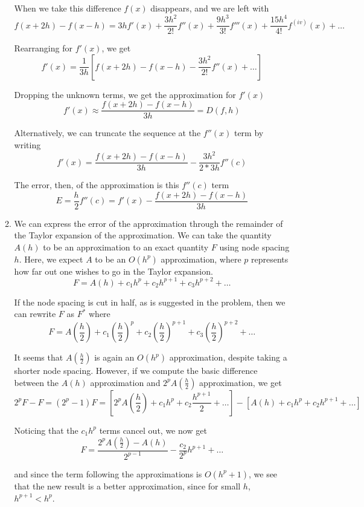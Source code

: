 \documentclass[11pt]{article}
\begin{document}
\begin{enumerate}
\begin{enumerate}
		When we take this difference $f(x)$ disappears, and we are left with
		\[
		f(x+2h) - f(x-h) = 3hf'(x) + \frac{3h^2}{2!}f''(x) + \frac{9h^3}{3!}f'''(x) + \frac{15h^4}{4!}f^{(iv)}(x) + \ldots
		\]

		Rearranging for $f'(x)$, we get
		\[
		f'(x) = \frac{1}{3h}[f(x+2h)-f(x-h)-\frac{3h^2}{2!}f''(x) + \ldots]
		\]

		Dropping the unknown terms, we get the approximation for $f'(x)$
		\[
		f'(x) \approx \frac{f(x+2h)-f(x-h)}{3h} = D(f,h)
		\]

		Alternatively, we can truncate the sequence at the $f''(x)$ term by writing
		\[
		f'(x) = \frac{f(x+2h) - f(x-h)}{3h} - \frac{3h^2}{2*3h}f''(c)
		\]

		The error, then, of the approximation is this $f''(c)$ term
		\[
		E = \frac{h}{2}f''(c) = f'(x) - \frac{f(x+2h)-f(x-h)}{3h}
		\]

		\item We can express the error of the approximation through the remainder of the Taylor expansion of the approximation. We can take the quantity $A(h)$ to be an approximation to an exact quantity $F$ using node spacing $h$. Here, we expect $A$ to be an $O(h^p)$ approximation, where $p$ represents how far out one wishes to go in the Taylor expansion.
		\[
		F = A(h) + c_1h^p + c_2h^{p+1} + c_3h^{p+2} + \ldots
		\]

		If the node spacing is cut in half, as is suggested in the problem, then we can rewrite $F$ as $F^*$ where
		\[
		F = A(\frac{h}{2}) + c_1(\frac{h}{2})^p + c_2(\frac{h}{2})^{p+1} + c_3(\frac{h}{2})^{p+2} + \ldots
		\]

		It seems that $A(\frac{h}{2})$ is again an $O(h^p)$ approximation, despite taking a shorter node spacing. However, if we compute the basic difference between the $A(h)$ approximation and $2^pA(\frac{h}{2})$ approximation, we get
		\[
		2^pF - F = (2^p-1)F= [2^pA(\frac{h}{2}) + c_1h^p + c_2\frac{h^{p+1}}{2} + \ldots] - [A(h) + c_1h^p + c_2h^{p+1} + \ldots]
		\]

		Noticing that the $c_1h^p$ terms cancel out, we now get
		\[
		F = \frac{2^pA(\frac{h}{2})-A(h)}{2^{p-1}} - \frac{c_2}{2^p}h^{p+1} + \ldots
		\]

		and since the term following the approximations is $O(h^p+1)$, we see that the new result is a better approximation, since for small $h$, $h^{p+1} < h^p$.

		\medskip

	\end{enumerate}


\end{enumerate}
\end{document}
